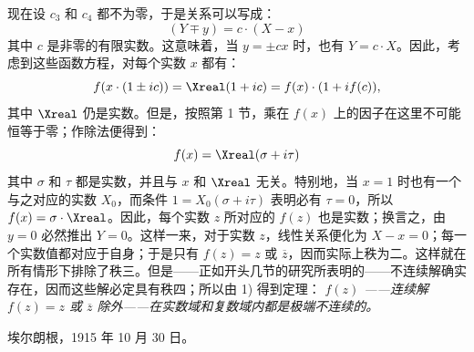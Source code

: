 现在设 \(c_3\) 和 \(c_4\) 都不为零，于是关系可以写成：
\[
(Y\mp y)=c\cdot(X-x)
\]
其中 \(c\) 是非零的有限实数。这意味着，当 \(y=\pm cx\) 时，也有 \(Y=c\cdot X\)。因此，考虑到这些函数方程，对每个实数 \(x\) 都有：
\[
f(x\cdot(1\pm ic))=\Xreal(1+ic)=f(x)\cdot(1+i f(c)),
\]
其中 \(\Xreal\) 仍是实数。但是，按照第 1 节，乘在 \(f(x)\) 上的因子在这里不可能恒等于零；作除法便得到：
\[
f(x)=\Xreal(\sigma+i\tau)
\]
其中 \(\sigma\) 和 \(\tau\) 都是实数，并且与 \(x\) 和 \(\Xreal\) 无关。特别地，当 \(x=1\) 时也有一个与之对应的实数 \(X_0\)，而条件 \(1=X_0(\sigma+i\tau)\) 表明必有 \(\tau=0\)，所以 \(f(x)=\sigma\cdot\Xreal\)。因此，每个实数 \(z\) 所对应的 \(f(z)\) 也是实数；换言之，由 \(y=0\) 必然推出 \(Y=0\)。这样一来，对于实数 \(z\)，线性关系便化为 \(X-x=0\)；每一个实数值都对应于自身；于是只有 \(f(z)=z\) 或 \(\overline z\)，因而实际上秩为二。这样就在所有情形下排除了秩三。但是——正如开头几节的研究所表明的——不连续解确实存在，因而这些解必定具有秩四；所以由 1) 得到定理：\emph{ \(f(z)\) \emph{——连续解} \(f(z)=z\) \emph{或} \(\overline z\) \emph{除外——在实数域和复数域内都是极端不连续的。}}

\medskip
\noindent 埃尔朗根，1915 年 10 月 30 日。


\clearpage
\setcounter{footnote}{0}
